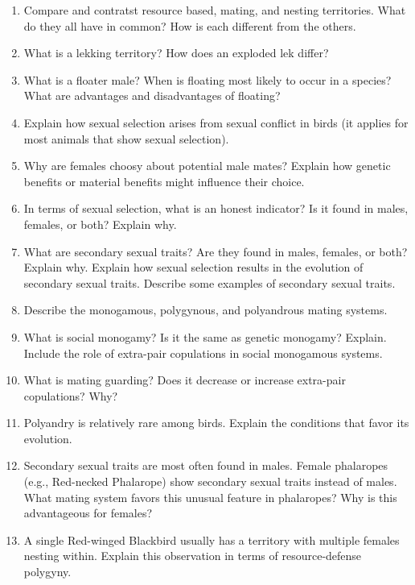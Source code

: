 \documentclass[nofonts, letterpaper]{tufte-handout}
\begin{document}
\begin{enumerate}

\item Compare and contratst resource based, mating, and nesting territories. What do they all have in common? How is each different from the others.

\item What is a lekking territory? How does an exploded lek differ?

\item What is a floater male? When is floating most likely to occur in a species? What are advantages and disadvantages of floating?

\item Explain how sexual selection arises from sexual conflict in birds (it applies for most animals that show sexual selection).

\item Why are females choosy about potential male mates? Explain how genetic benefits or material benefits might influence their choice.

\item In terms of sexual selection, what is an honest indicator? Is it found in males, females, or both? Explain why.

\item What are secondary sexual traits? Are they found in males, females, or both? Explain why. Explain how sexual selection results in the evolution of secondary sexual traits. Describe some examples of secondary sexual traits.

\item Describe the monogamous, polygynous, and polyandrous mating systems.

\item What is social monogamy? Is it the same as genetic monogamy? Explain. Include the role of extra-pair copulations in social monogamous systems.

\item What is mating guarding? Does it decrease or increase extra-pair copulations? Why?

\item Polyandry is relatively rare among birds. Explain the conditions that favor its evolution.

\item Secondary sexual traits are most often found in males. Female phalaropes (e.g., Red-necked Phalarope) show secondary sexual traits instead of males. What mating system favors this unusual feature in phalaropes? Why is this advantageous for females?

\item A single Red-winged Blackbird usually has a territory with multiple females nesting within. Explain this observation in terms of resource-defense polygyny.


\end{enumerate}
\end{document}
